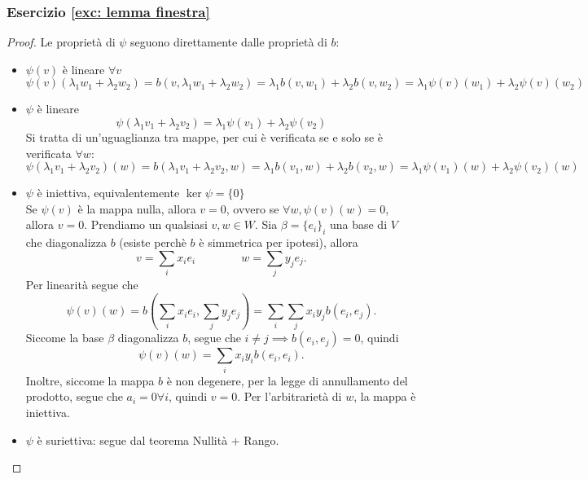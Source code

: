\documentclass{article}     %
\begin{document}
\subsubsection*{Esercizio \ref{exc: lemma finestra}}\label{sol: lemma finestra}
\begin{proof}Le proprietà di $\psi$ seguono direttamente dalle proprietà di $b$:
    \begin{itemize}
        \item $\psi(v)$ è lineare $\forall v$
            \[\psi(v)(\lambda_1w_1+\lambda_2w_2)=b(v,\lambda_1w_1+\lambda_2w_2)= \lambda_1b(v,w_1)+\lambda_2b(v,w_2) = \lambda_1\psi(v)(w_1)+\lambda_2\psi(v)(w_2) \]
        \item  $\psi$ è lineare
        \[\psi(\lambda_1v_1+\lambda_2v_2)=\lambda_1\psi(v_1)+\lambda_2\psi(v_2)\]
        Si tratta di un'uguaglianza tra mappe, per cui è verificata se e solo se è verificata $\forall w$:
        \[\psi(\lambda_1v_1+\lambda_2v_2)(w)= b(\lambda_1v_1+\lambda_2v_2,w)= \lambda_1b(v_1,w)+\lambda_2b(v_2,w)= \lambda_1\psi(v_1)(w)+\lambda_2\psi(v_2)(w)\]
        \item $\psi$ è iniettiva, equivalentemente $\ker \psi =\{0\}$
        \\Se $\psi(v)$ è la mappa nulla, allora $v=0$, ovvero se $\forall w, \psi(v)(w)=0$, allora $v=0$.
        Prendiamo un qualsiasi $v,w\in W$. Sia $\beta=\{e_i\}_i$ una base di $V$ che diagonalizza $b$ (esiste perchè $b$ è simmetrica per ipotesi), allora
        \[v=\sum_ix_ie_i\qquad \qquad w=\sum_jy_je_j.\]
        Per linearità segue che
        \[\psi(v)(w)=b\left(\sum_ix_ie_i, \sum_jy_je_j\right)=\sum_i\sum_jx_iy_jb(e_i,e_j).\]
        Siccome la base $\beta$ diagonalizza $b$, segue che $i\neq j\implies b(e_i,e_j)=0$, quindi 
        \[\psi(v)(w)=\sum_ix_iy_ib(e_i,e_i).\]
        Inoltre, siccome la mappa $b$ è non degenere, per la legge di annullamento del prodotto, segue che $a_i=0\forall i$, quindi $v=0$. Per l'arbitrarietà di $w$, la mappa è iniettiva.
        \item $\psi$ è suriettiva: segue dal teorema Nullità + Rango.
    \end{itemize}
\end{proof}
\end{document}

